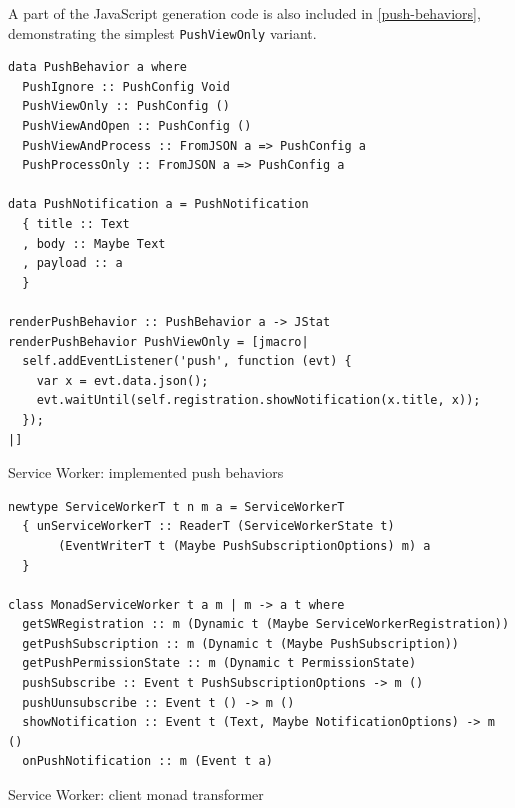 \documentclass[english,zadani,odsaz]{fitthesis}
\begin{document}
A part of the JavaScript generation code is also included in \ref{push-behaviors},
demonstrating the simplest \texttt{PushViewOnly} variant.

\begin{listing}[p]
\begin{verbatim}
data PushBehavior a where
  PushIgnore :: PushConfig Void
  PushViewOnly :: PushConfig ()
  PushViewAndOpen :: PushConfig ()
  PushViewAndProcess :: FromJSON a => PushConfig a
  PushProcessOnly :: FromJSON a => PushConfig a

data PushNotification a = PushNotification
  { title :: Text
  , body :: Maybe Text
  , payload :: a
  }

renderPushBehavior :: PushBehavior a -> JStat
renderPushBehavior PushViewOnly = [jmacro|
  self.addEventListener('push', function (evt) {
    var x = evt.data.json();
    evt.waitUntil(self.registration.showNotification(x.title, x));
  });
|]
\end{verbatim}
\caption{Service Worker: implemented push behaviors \label{push-behaviors}}
\end{listing}

\begin{listing}[p]
\begin{verbatim}
newtype ServiceWorkerT t n m a = ServiceWorkerT
  { unServiceWorkerT :: ReaderT (ServiceWorkerState t)
       (EventWriterT t (Maybe PushSubscriptionOptions) m) a
  }

class MonadServiceWorker t a m | m -> a t where
  getSWRegistration :: m (Dynamic t (Maybe ServiceWorkerRegistration))
  getPushSubscription :: m (Dynamic t (Maybe PushSubscription))
  getPushPermissionState :: m (Dynamic t PermissionState)
  pushSubscribe :: Event t PushSubscriptionOptions -> m ()
  pushUunsubscribe :: Event t () -> m ()
  showNotification :: Event t (Text, Maybe NotificationOptions) -> m ()
  onPushNotification :: m (Event t a)
\end{verbatim}
\caption{Service Worker: client monad transformer \label{sw-client-mtl}}
\end{listing}
\end{document}

